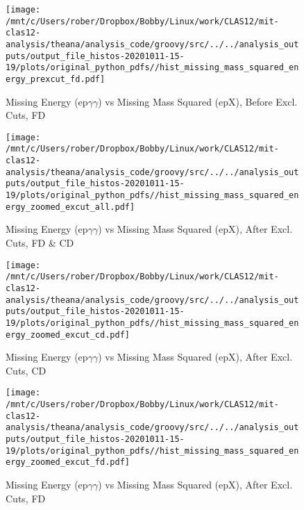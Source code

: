 \documentclass{article}
\begin{document}
\begin{landscape}
    \begin{figure}[h]
        \centering

        \texttt{[image: /mnt/c/Users/rober/Dropbox/Bobby/Linux/work/CLAS12/mit-clas12-analysis/theana/analysis\_code/groovy/src/../../analysis\_outputs/output\_file\_histos-20201011-15-19/plots/original\_python\_pdfs//hist\_missing\_mass\_squared\_energy\_prexcut\_fd.pdf]}
        \captionsetup{textformat=empty,labelformat=blank}
        \caption{Missing Energy (ep$\gamma$$\gamma$) vs Missing Mass Squared (epX), Before Excl. Cuts, FD}
    \end{figure}
    \clearpage
    
    \begin{figure}[h]
        \centering

        \texttt{[image: /mnt/c/Users/rober/Dropbox/Bobby/Linux/work/CLAS12/mit-clas12-analysis/theana/analysis\_code/groovy/src/../../analysis\_outputs/output\_file\_histos-20201011-15-19/plots/original\_python\_pdfs//hist\_missing\_mass\_squared\_energy\_zoomed\_excut\_all.pdf]}
        \captionsetup{textformat=empty,labelformat=blank}
        \caption{Missing Energy (ep$\gamma$$\gamma$) vs Missing Mass Squared (epX), After Excl. Cuts, FD \& CD}
    \end{figure}
    \clearpage
    
    \begin{figure}[h]
        \centering

        \texttt{[image: /mnt/c/Users/rober/Dropbox/Bobby/Linux/work/CLAS12/mit-clas12-analysis/theana/analysis\_code/groovy/src/../../analysis\_outputs/output\_file\_histos-20201011-15-19/plots/original\_python\_pdfs//hist\_missing\_mass\_squared\_energy\_zoomed\_excut\_cd.pdf]}
        \captionsetup{textformat=empty,labelformat=blank}
        \caption{Missing Energy (ep$\gamma$$\gamma$) vs Missing Mass Squared (epX), After Excl. Cuts, CD}
    \end{figure}
    \clearpage
    
    \begin{figure}[h]
        \centering

        \texttt{[image: /mnt/c/Users/rober/Dropbox/Bobby/Linux/work/CLAS12/mit-clas12-analysis/theana/analysis\_code/groovy/src/../../analysis\_outputs/output\_file\_histos-20201011-15-19/plots/original\_python\_pdfs//hist\_missing\_mass\_squared\_energy\_zoomed\_excut\_fd.pdf]}
        \captionsetup{textformat=empty,labelformat=blank}
        \caption{Missing Energy (ep$\gamma$$\gamma$) vs Missing Mass Squared (epX), After Excl. Cuts, FD}
    \end{figure}
    \clearpage
    

\end{landscape}
\end{document}
